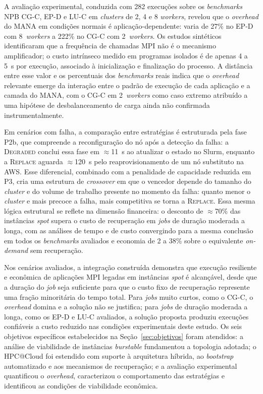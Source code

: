 A avaliação experimental, conduzida com 282 execuções sobre os \textit{benchmarks} NPB
CG-C, EP-D e LU-C em \textit{clusters} de 2, 4 e 8 \textit{workers}, revelou que o
\textit{overhead} do MANA em condições normais é aplicação-dependente: varia de 27\%
no EP-D com 8~\textit{workers} a 222\% no CG-C com 2~\textit{workers}. Os estudos
sintéticos identificaram que a frequência de chamadas MPI não é o mecanismo
amplificador; o custo intrínseco medido em programas isolados é de apenas 4 a 5~s por
execução, associado à inicialização e finalização do processo. A distância entre esse
valor e os percentuais dos \textit{benchmarks} reais indica que o \textit{overhead}
relevante emerge da interação entre o padrão de execução de cada aplicação e a camada
do MANA, com o CG-C em 2~\textit{workers} como caso extremo atribuído a uma hipótese
de desbalanceamento de carga ainda não confirmada instrumentalmente.

Em cenários com falha, a comparação entre estratégias é estruturada pela fase P2b, que
compreende a reconfiguração do nó após a detecção da falha: a \textsc{Degraded} conclui
essa fase em $\approx$11~s ao atualizar o estado no Slurm, enquanto a \textsc{Replace}
aguarda $\approx$120~s pelo reaprovisionamento de um nó substituto na AWS. Esse
diferencial, combinado com a penalidade de capacidade reduzida em P3, cria uma estrutura
de \textit{crossover} em que o vencedor depende do tamanho do \textit{cluster} e do
volume de trabalho presente no momento da falha: quanto menor o \textit{cluster} e mais
precoce a falha, mais competitiva se torna a \textsc{Replace}. Essa mesma lógica
estrutural se reflete na dimensão financeira: o desconto de $\approx$70\% das instâncias
\textit{spot} supera o custo de recuperação em \textit{jobs} de duração moderada a
longa, com as análises de tempo e de custo convergindo para a mesma conclusão em todos
os \textit{benchmarks} avaliados e economia de 2 a 38\% sobre o equivalente
\textit{on-demand} sem recuperação.

Nos cenários avaliados, a integração construída demonstra que execução resiliente e
econômica de aplicações MPI legadas em instâncias \textit{spot} é alcançável, desde que
a duração do \textit{job} seja suficiente para que o custo fixo de recuperação represente
uma fração minoritária do tempo total. Para \textit{jobs} muito curtos, como o CG-C, o
\textit{overhead} domina e a solução não se justifica; para \textit{jobs} de duração
moderada a longa, como os EP-D e LU-C avaliados, a solução proposta produziu execuções
confiáveis a custo reduzido nas condições experimentais deste estudo. Os seis objetivos
específicos estabelecidos na Seção~\ref{sec:objetivos} foram atendidos: a análise de
viabilidade de instâncias \textit{burstable} fundamentou a topologia adotada; o
HPC@Cloud foi estendido com suporte à arquitetura híbrida, ao \textit{bootstrap}
automatizado e aos mecanismos de recuperação; e a avaliação experimental quantificou o
\textit{overhead}, caracterizou o comportamento das estratégias e identificou as
condições de viabilidade econômica.

